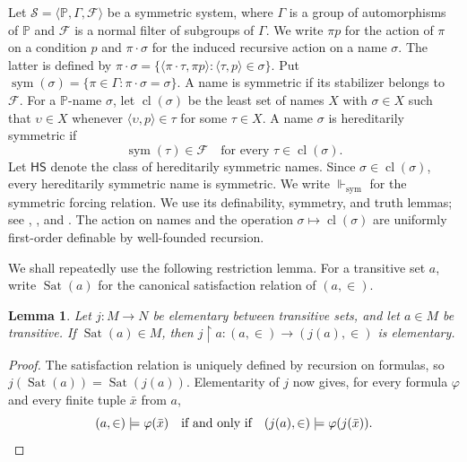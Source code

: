 \documentclass[11pt,a4paper]{amsart}
\newcommand{\HS}{\mathsf{HS}}
\newcommand{\sym}{\operatorname{sym}}
\newcommand{\forcesS}{\Vdash_{\mathrm{sym}}}
\newcommand{\restr}{\mathbin{\upharpoonright}}
\theoremstyle{plain}
\newtheorem{lemma}[theorem]{Lemma}
\theoremstyle{definition}
\theoremstyle{remark}
\begin{document}
Let $\mathscr S=\langle\mathbb P,\Gamma,\mathcal F\rangle$ be a symmetric system, where $\Gamma$ is a group of automorphisms of $\mathbb P$ and $\mathcal F$ is a normal filter of subgroups of $\Gamma$.  We write $\pi p$ for the action of $\pi$ on a condition $p$ and $\pi\cdot\sigma$ for the induced recursive action on a name $\sigma$.  The latter is defined by
$\pi\cdot\sigma=\{\langle\pi\cdot\tau,\pi p\rangle:\langle\tau,p\rangle\in\sigma\}$.  Put $\sym(\sigma)=\{\pi\in\Gamma:\pi\cdot\sigma=\sigma\}$.  A name is symmetric if its stabilizer belongs to $\mathcal F$.  For a $\mathbb P$-name $\sigma$, let $\operatorname{cl}(\sigma)$ be the least set of names $X$ with $\sigma\in X$ such that $\upsilon\in X$ whenever $\langle\upsilon,p\rangle\in\tau$ for some $\tau\in X$.  A name $\sigma$ is hereditarily symmetric if
\begin{equation}\label{eq:HS-characterization}
\sym(\tau)\in\mathcal F\quad\text{for every }\tau\in\operatorname{cl}(\sigma).
\end{equation}
Let $\HS$ denote the class of hereditarily symmetric names.  Since $\sigma\in\operatorname{cl}(\sigma)$, every hereditarily symmetric name is symmetric.  We write $\forcesS$ for the symmetric forcing relation.  We use its definability, symmetry, and truth lemmas; see \cite[Chapter~5]{Jech}, \cite[Section~2]{Karagila}, and {\cite[Lemma~2.2 and Theorem~2.5]{HayutKaragilaSmall}}.  The action on names and the operation $\sigma\mapsto\operatorname{cl}(\sigma)$ are uniformly first-order definable by well-founded recursion.

We shall repeatedly use the following restriction lemma.  For a transitive set $a$, write $\operatorname{Sat}(a)$ for the canonical satisfaction relation of $(a,\in)$.

\begin{lemma}\label{lem:restriction-elementarity}
Let $j:M\to N$ be elementary between transitive sets, and let $a\in M$ be transitive.  If $\operatorname{Sat}(a)\in M$, then $j\restr a:(a,\in)\longrightarrow(j(a),\in)$ is elementary.
\end{lemma}

\begin{proof}
The satisfaction relation is uniquely defined by recursion on formulas, so
$j(\operatorname{Sat}(a))=\operatorname{Sat}(j(a))$.  Elementarity of $j$ now gives, for every formula $\varphi$ and every finite tuple $\bar x$ from $a$,
\[
(a,\in)\models\varphi(\bar x)
\quad\text{if and only if}\quad
(j(a),\in)\models\varphi(j(\bar x)).\qedhere
\]
\end{proof}
\end{document}
